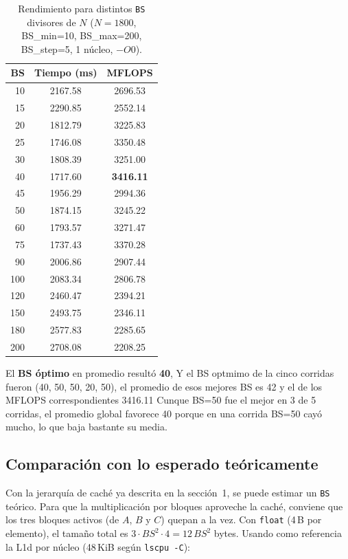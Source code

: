 \documentclass[11pt,a4paper]{article}
\begin{document}
\begin{table}[H]
\centering
\begin{tabular}{@{}rcc@{}}
\toprule
\textbf{BS} & \textbf{Tiempo (ms)} & \textbf{MFLOPS} \\
\midrule
10  & 2167.58 & 2696.53 \\
15  & 2290.85 & 2552.14 \\
20  & 1812.79 & 3225.83 \\
25  & 1746.08 & 3350.48 \\
30  & 1808.39 & 3251.00 \\
40  & 1717.60 & \textbf{3416.11} \\
45  & 1956.29 & 2994.36 \\
50  & 1874.15 & 3245.22 \\
60  & 1793.57 & 3271.47 \\
75  & 1737.43 & 3370.28 \\
90  & 2006.86 & 2907.44 \\
100 & 2083.34 & 2806.78 \\
120 & 2460.47 & 2394.21 \\
150 & 2493.75 & 2346.11 \\
180 & 2577.83 & 2285.65 \\
200 & 2708.08 & 2208.25 \\
\bottomrule
\end{tabular}
\caption{Rendimiento para distintos \texttt{BS} divisores de \(N\) (\(N=1800\), BS\_min=10, BS\_max=200, BS\_step=5, 1 núcleo, \(-O0\)).}
\label{tab:bs}
\end{table}

El \textbf{BS óptimo} en promedio resultó \textbf{40},  Y el BS optmimo de la cinco corridas fueron (40, 50, 50, 20, 50), el promedio de esos mejores BS es 42 y el de los MFLOPS correspondientes 3416.11 Cunque BS=50 fue el mejor en 3 de 5 corridas, el promedio global favorece 40 porque en una corrida BS=50 cayó mucho, lo que baja bastante su media.

\subsection*{Comparación con lo esperado teóricamente}

Con la jerarquía de caché ya descrita en la sección~1, se puede estimar un \texttt{BS} teórico. Para que la multiplicación por bloques aproveche la caché, conviene que los tres bloques activos (de \(A\), \(B\) y \(C\)) quepan a la vez. Con \texttt{float} (4\,B por elemento), el tamaño total es \(3 \cdot BS^2 \cdot 4 = 12\,BS^2\) bytes. Usando como referencia la L1d por núcleo (48\,KiB según \texttt{lscpu -C}):
\end{document}
